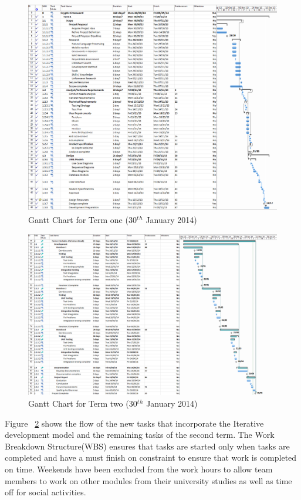 \begin{landscape}
\begin{figure}[H]
  \centering
  \includegraphics[scale=0.35]{images/gant_chart_interim_term1.png}
  \caption{Gantt Chart for Term one (30$^t$$^h$ January 2014)}
  \label{fig:ganttinterimterm1}
\end{figure}

\begin{figure}[H]
  \centering
  \includegraphics[width=\linewidth]{images/gant_chart_interim_term2.png}
  \caption{Gantt Chart for Term two (30$^t$$^h$ January 2014)}
  \label{fig:ganttinterimterm2}
\end{figure}

Figure ~\ref{fig:ganttinterimterm2} shows the flow of the new tasks that incorporate the Iterative development model and the remaining tasks of the second term. The Work Breakdown Structure(WBS) ensures that tasks are started only when tasks are completed and have a must finish on constraint to ensure that work is completed on time. Weekends have been excluded from the work hours to allow team members to work on other modules from their university studies as well as time off for social activities.



\end{landscape}
